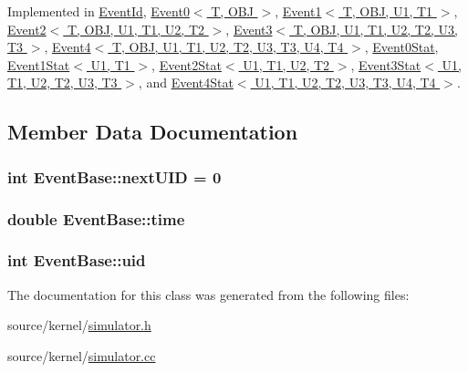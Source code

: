 Implemented in \hyperlink{classEventId_8627fa7b92746ddd1bd8b582b68fb3d1}{EventId}, \hyperlink{classEvent0_77176d1040ed4cc48fa750c4854212b9}{Event0$<$ T, OBJ $>$}, \hyperlink{classEvent1_6d7e716e16ab6ee6672807250860cdd8}{Event1$<$ T, OBJ, U1, T1 $>$}, \hyperlink{classEvent2_428b314837eee680fa435cad61944af3}{Event2$<$ T, OBJ, U1, T1, U2, T2 $>$}, \hyperlink{classEvent3_1b9501d43723072952055c5abd9dc9be}{Event3$<$ T, OBJ, U1, T1, U2, T2, U3, T3 $>$}, \hyperlink{classEvent4_69f98edf52e4f93f5cf0e0d5464f6ce0}{Event4$<$ T, OBJ, U1, T1, U2, T2, U3, T3, U4, T4 $>$}, \hyperlink{classEvent0Stat_0cf3e0d44a1c04ee73a8a93a50ca05a1}{Event0Stat}, \hyperlink{classEvent1Stat_d39942fb840e55ee829decdf1927eadf}{Event1Stat$<$ U1, T1 $>$}, \hyperlink{classEvent2Stat_84e6e9e412678507da3b2bde8e6a157a}{Event2Stat$<$ U1, T1, U2, T2 $>$}, \hyperlink{classEvent3Stat_6901cb7acfdb3f021edd0a79c1766349}{Event3Stat$<$ U1, T1, U2, T2, U3, T3 $>$}, and \hyperlink{classEvent4Stat_4dfca297cb5eede83851898b5c4f2f76}{Event4Stat$<$ U1, T1, U2, T2, U3, T3, U4, T4 $>$}.

\subsection{Member Data Documentation}
\hypertarget{classEventBase_22a8c15e90a68f16042fd7b12dfe5935}{
\subsubsection[{nextUID}]{\setlength{\rightskip}{0pt plus 5cm}int {\bf EventBase::nextUID} = 0}}
\label{classEventBase_22a8c15e90a68f16042fd7b12dfe5935}


\hypertarget{classEventBase_b64e6661c521961aa3a18b8ac34566ed}{
\subsubsection[{time}]{\setlength{\rightskip}{0pt plus 5cm}double {\bf EventBase::time}}}
\label{classEventBase_b64e6661c521961aa3a18b8ac34566ed}


\hypertarget{classEventBase_f22f14be6b15b6f99d347b8726a7613a}{
\subsubsection[{uid}]{\setlength{\rightskip}{0pt plus 5cm}int {\bf EventBase::uid}}}
\label{classEventBase_f22f14be6b15b6f99d347b8726a7613a}




The documentation for this class was generated from the following files:\begin{CompactItemize}
\item 
source/kernel/\hyperlink{simulator_8h}{simulator.h}\item 
source/kernel/\hyperlink{simulator_8cc}{simulator.cc}\end{CompactItemize}
